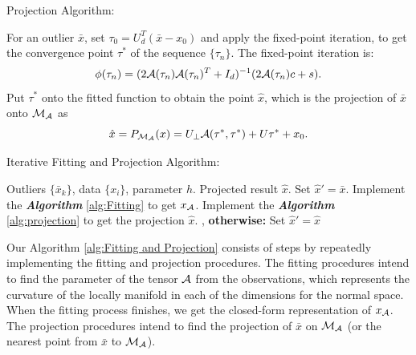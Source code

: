 \documentclass{article}
\theoremstyle{remark}
\begin{document}
\begin{algorithm}[H]
\caption{Projection Algorithm:}
\label{alg:projection}
\begin{algorithmic}
\STATE [1.] For an outlier $\bar{x}$, set $\tau_0 = U_d^T(\bar{x}-x_0)$ and apply the fixed-point iteration, to get the convergence point $\tau^*$ of the sequence $\{\tau_n\}$. The fixed-point iteration is: 
\[
 \phi(\tau_{n})=( 2{\cal A}(\tau_{n}){\cal A}(\tau_{n})^T+ I_d)^{-1} (2{\cal A}(\tau_{n})c+ s).
\]
\STATE [2.] Put $\tau^*$ onto the fitted function  to obtain the point $\hat{x}$, which is the projection of $\bar{x}$ onto ${\cal M}_{\cal A}$ as
\[
\hat{x} = P_{\cal M_A} (x) =  U_{\perp} {\cal A} (\tau^*,\tau^*) + U \tau^* +x_0.
\]
\end{algorithmic}
\end{algorithm}
\begin{algorithm}[H]
\caption{Iterative Fitting and Projection Algorithm:}
\label{alg:Fitting and Projection}
\begin{algorithmic}
 Outliers $\{\bar{x}_k\}$, data $\{x_i\}$, parameter $h$.
 Projected result $\hat{x}$.
\STATE Set $\hat{x}' = \bar{x}$.
\REPEAT
\STATE Implement the {\bfseries {\it  Algorithm}} \ref{alg:Fitting} to get $x_{\cal A}$.
\STATE Implement the {\bfseries {\it  Algorithm}} \ref{alg:projection} to get the projection $\hat{x}$.
, {\bfseries otherwise:} Set $\hat{x}'=\hat{x}$
\ENDFOR
\end{algorithmic}
\end{algorithm}
Our Algorithm \ref{alg:Fitting and Projection} consists of steps by repeatedly implementing the fitting and projection procedures. The fitting procedures intend to find the parameter of the tensor $\cal A$ from the observations, which represents the curvature of the locally manifold in each of the dimensions for the normal space. When the fitting process finishes, we get the closed-form representation of $x_{\cal A}$. The projection procedures intend to find the projection of $\bar{x}$ on $\cal M_A$ (or the nearest point from  $\bar{x}$ to $\cal M_A$). %

\end{document}
